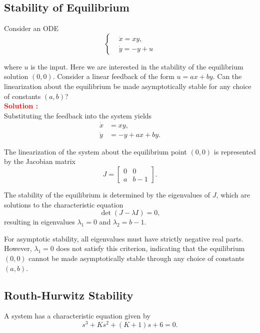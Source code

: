 \documentclass[12pt]{article}
\begin{document}
\subsection{Stability of Equilibrium}

Consider an ODE 
\begin{equation}
    \begin{cases}
        &\dot{x} = xy, \\
        &\dot{y} = -y + u
    \end{cases}
\end{equation}


where \(u\) is the input. Here we are interested in the stability of the equilibrium solution \((0,0)\). Consider a linear feedback of the form \(u = ax + by\). Can the linearization about the equilibrium be made asymptotically stable for any choice of constants \((a,b)\)?\\

\textbf{\textcolor{red}{Solution :}} \\
Substituting the feedback into the system yields
\begin{align*}
    \dot{x} &= xy, \\
    \dot{y} &= -y + ax + by.
\end{align*}

The linearization of the system about the equilibrium point \((0,0)\) is represented by the Jacobian matrix
\[
J = \begin{bmatrix}
    0 & 0 \\
    a & b-1
\end{bmatrix}.
\]

The stability of the equilibrium is determined by the eigenvalues of \(J\), which are solutions to the characteristic equation
\[
\det(J - \lambda I) = 0,
\]
resulting in eigenvalues \(\lambda_1 = 0\) and \(\lambda_2 = b-1\).

For asymptotic stability, all eigenvalues must have strictly negative real parts. However, \(\lambda_1 = 0\) does not satisfy this criterion, indicating that the equilibrium \((0,0)\) cannot be made asymptotically stable through any choice of constants \((a,b)\).
\clearpage

\subsection{Routh-Hurwitz Stability}

A system has a characteristic equation given by
\begin{equation}
    s^3 + Ks^2 + (K+1)s + 6 = 0.
\end{equation}
\end{document}
